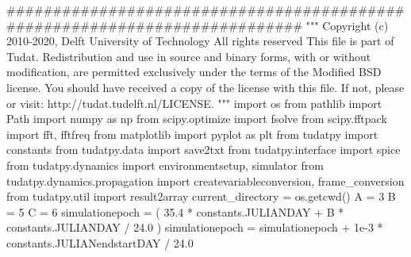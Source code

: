 {}
\markdownRendererSectionEnd \markdownRendererSectionBegin
{}\markdownRendererInterblockSeparator
{}
\markdownRendererSectionEnd \markdownRendererSectionBegin
\markdownRendererHeadingOne{}\markdownRendererInterblockSeparator
{}
\markdownRendererSectionEnd \markdownRendererSectionBegin
{}\markdownRendererInterblockSeparator
{}
\markdownRendererSectionEnd \markdownRendererSectionBegin
\markdownRendererHeadingOne{}\markdownRendererInterblockSeparator
{}########################################################################### """ Copyright (c) 2010-2020, Delft University of Technology All rights reserved This file is part of Tudat. Redistribution and use in source and binary forms, with or without modification, are permitted exclusively under the terms of the Modified BSD license. You should have received a copy of the license with this file. If not, please or visit: http://tudat.tudelft.nl/LICENSE. """ import os from pathlib import Path import numpy as np from scipy.optimize import fsolve from scipy.fftpack import fft, fftfreq from matplotlib import pyplot as plt from tudatpy import constants from tudatpy.data import save2txt from tudatpy.interface import spice from tudatpy.dynamics import environmentsetup, simulator from tudatpy.dynamics.propagation import createvariableconversion, frame_conversion from tudatpy.util import result2array\markdownRendererInterblockSeparator
{}
\markdownRendererSectionEnd \markdownRendererSectionBegin
{}\markdownRendererInterblockSeparator
{}current_directory = os.getcwd()\markdownRendererInterblockSeparator
{}
\markdownRendererSectionEnd \markdownRendererSectionBegin
{}\markdownRendererInterblockSeparator
{}A = 3 B = 5 C = 6 simulationepoch = ( 35.4 * constants.JULIANDAY + B * constants.JULIANDAY / 24.0 ) simulationepoch = simulationepoch + 1e-3 * constants.JULIANendstartDAY / 24.0\markdownRendererInterblockSeparator

